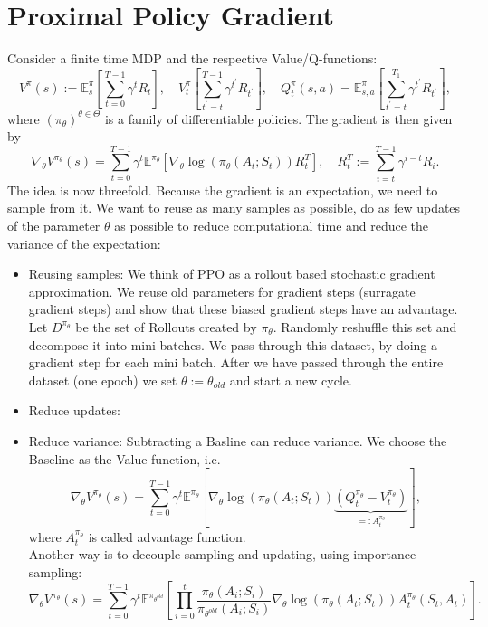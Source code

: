 \documentclass[../main.tex]{subfiles}  %
\begin{document}
\section{Proximal Policy Gradient}
Consider a finite time MDP and the respective Value/Q-functions:
\[
V^\pi (s) := \mathbb{E}_{s}^\pi [\sum_{t=0}^{T-1} \gamma^t R_t ], \quad V_t^\pi [\sum_{t^\prime=t}^{T-1} \gamma^{t^\prime} R_{t^\prime} ], \quad Q_t^\pi (s,a) = \mathbb{E}_{s,a}^\pi [\sum_{t^\prime =t}^{T_1} \gamma^{t^\prime} R_{t^\prime}],
\]
where $(\pi_\theta)^{\theta \in \Theta}$ is a family of differentiable policies. The gradient is then given by 
\[
\nabla_\theta V^{\pi_\theta} (s) = \sum_{t=0}^{T-1} \gamma^t \mathbb{E}^{\pi_\theta} [\nabla_{\theta} \log(\pi_\theta (A_t;S_t)) R_t^T  ], \quad R_t^T := \sum_{i=t}^{T-1} \gamma^{i-t} R_i. 
\]
The idea is now threefold. Because the gradient is an expectation, we need to sample from it. We want to reuse as many samples as possible, do as few updates of the parameter $\theta$ as possible to reduce computational time and reduce the variance of the expectation:
\begin{itemize}
    \item Reusing samples: We think of PPO as a rollout based stochastic gradient approximation. We reuse old parameters for gradient steps (surragate gradient steps) and show that these biased gradient steps have an advantage. Let $D^{\pi_\theta}$ be the set of Rollouts created by $\pi_\theta$. Randomly reshuffle this set and decompose it into mini-batches. We pass through this dataset, by doing a gradient step for each mini batch. After we have passed through the entire dataset (one epoch) we set $\theta := \theta_{old}$ and start a new cycle.
    \item Reduce updates:
    \item Reduce variance: Subtracting a Basline can reduce variance. We choose the Baseline as the Value function, i.e. 
    \[
    \nabla_\theta V^{\pi_\theta} (s) = \sum_{t=0}^{T-1} \gamma^t \mathbb{E}^{\pi_\theta} [\nabla_{\theta} \log(\pi_\theta (A_t;S_t)) \underbrace{(Q_t^{\pi_\theta} -V_t^{\pi_\theta})}_{=: A_t^{\pi_\theta} }  ],
    \]
    where $A_t^{\pi_\theta}$ is called advantage function.\\
    Another way is to decouple sampling and updating, using importance sampling: 
    \[
    \nabla_\theta V^{\pi_\theta} (s) = \sum_{t=0}^{T-1} \gamma^t \mathbb{E}^{\pi_{\theta^{old}}} \left[ \prod_{i=0}^t \frac{\pi_\theta (A_i;S_i)}{\pi_{\theta^{old}} (A_i;S_i)} \nabla_\theta \log (\pi_\theta (A_t;S_t) ) A_t^{\pi_\theta} (S_t,A_t) \right].
    \]
\end{itemize}
\end{document}
